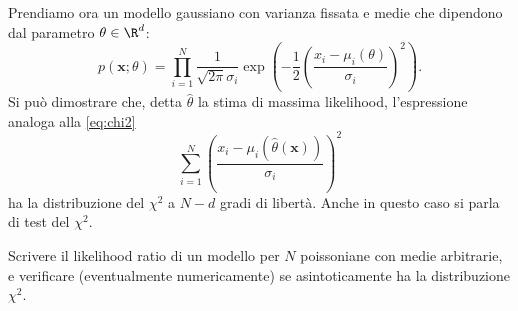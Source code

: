 Prendiamo ora un modello gaussiano con varianza fissata e medie che dipendono dal parametro $\theta\in\R^d$:
\begin{equation*}
	p(\mathbf x;\theta)
	= \prod_{i=1}^N \frac1{\sqrt{2\pi}\sigma_i}
	\exp\left(-\frac12\left(\frac{x_i-\mu_i(\theta)}{\sigma_i}\right)^2\right).
\end{equation*}
Si può dimostrare che,
detta $\hat\theta$ la stima di massima likelihood,
l'espressione analoga alla \eqref{eq:chi2}
\begin{equation*}
	\sum_{i=1}^N \left( \frac {x_i-\mu_i(\hat\theta(\mathbf x))} {\sigma_i} \right)^2
\end{equation*}
%
ha la distribuzione del $\chi^2$ a $N-d$ gradi di libertà.
Anche in questo caso si parla di test del $\chi^2$.

\begin{exercise}
	Scrivere il likelihood ratio di un modello per $N$ poissoniane con medie arbitrarie,
	e verificare (eventualmente numericamente) se asintoticamente ha la distribuzione $\chi^2$.
\end{exercise}
